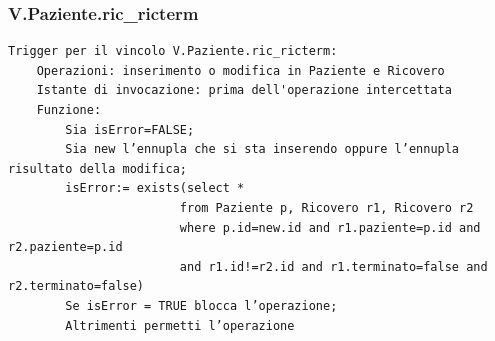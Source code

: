 \documentclass[12pt, letterpaper]{article}
\begin{document}
\subsubsection{V.Paziente.ric\_ricterm}
\begin{verbatim}
Trigger per il vincolo V.Paziente.ric_ricterm:
    Operazioni: inserimento o modifica in Paziente e Ricovero
    Istante di invocazione: prima dell'operazione intercettata
    Funzione:
        Sia isError=FALSE;
        Sia new l’ennupla che si sta inserendo oppure l’ennupla risultato della modifica;
        isError:= exists(select * 
                        from Paziente p, Ricovero r1, Ricovero r2
                        where p.id=new.id and r1.paziente=p.id and r2.paziente=p.id 
                        and r1.id!=r2.id and r1.terminato=false and r2.terminato=false)
        Se isError = TRUE blocca l’operazione;
        Altrimenti permetti l’operazione
\end{verbatim}
\end{document}

